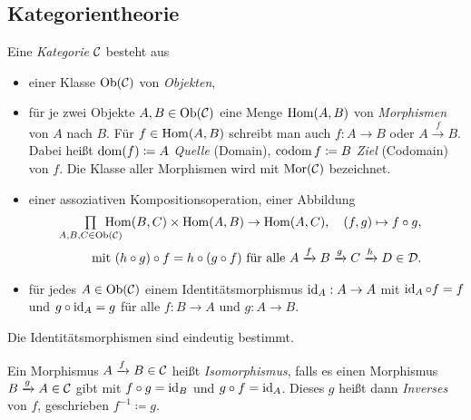 \documentclass{cheat-sheet}
\begin{document}
\begin{samepage}
\section{Kategorientheorie}

\begin{defn}
  Eine \emph{Kategorie} $\mathcal{C}$ besteht aus
  \begin{itemize}
    \item einer Klasse $\operatorname{Ob}(\mathcal{C})$ von \emph{Objekten},
    \item für je zwei Objekte $A, B \in \operatorname{Ob}(\mathcal{C})$ eine Menge $\operatorname{Hom}(A, B)$ von \emph{Morphismen} von $A$ nach $B$. Für $f \in \operatorname{Hom}(A, B)$ schreibt man auch $f : A \to B$ oder $A \xrightarrow{f} B$. Dabei heißt $\operatorname{dom}(f) \coloneqq A$ \emph{Quelle} (Domain), $\operatorname{codom}{f} \coloneqq B$ \emph{Ziel} (Codomain) von $f$. Die Klasse aller Morphismen wird mit $\operatorname{Mor}(\mathcal{C})$ bezeichnet.
    \item einer assoziativen Kompositionsoperation, \dh{} einer Abbildung
    \begin{align*}
      \quad \prod_{\mathclap{A, B, C \in \Ob(\Cat)}} \enspace \Hom(B, C) \times \Hom(A, B) \to \Hom(A, C), \quad
      (f, g) \mapsto f \circ g,\\
      \text{mit } (h \circ g) \circ f = h \circ (g \circ f)
      \text{ für alle } A \xrightarrow{f} B \xrightarrow{g} C \xrightarrow{h} D \in \Dat.
    \end{align*}
    \item für jedes $A \in \operatorname{Ob}(\mathcal{C})$ einem Identitätsmorphismus $\operatorname{id}_A : A \to A$ mit $\operatorname{id}_A \circ f = f$ und $g \circ \operatorname{id}_A = g$ für alle $f : B \to A$ und $g : A \to B$.
  \end{itemize}
\end{defn}
\end{samepage}

\begin{bem}
  Die Identitätsmorphismen sind eindeutig bestimmt.
\end{bem}

\begin{defn}
  Ein Morphismus $A \xrightarrow{f} B \in \mathcal{C}$ heißt \emph{Isomorphismus}, falls es einen Morphismus $B \xrightarrow{g} A \in \mathcal{C}$ gibt mit $f \circ g = \operatorname{id}_B$ und $g \circ f = \operatorname{id}_A$. Dieses $g$ heißt dann \emph{Inverses} von $f$, geschrieben $f^{-1} \coloneqq g$.
\end{defn}
\end{document}
